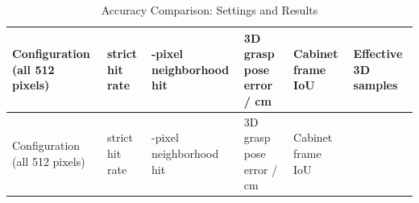 \FloatBarrier\begingroup\small\setlength{\tabcolsep}{2.5pt}
\begin{longtable}[]{@{}
  >{\raggedright\arraybackslash}p{}
  >{\raggedleft\arraybackslash}p{}
  >{\raggedleft\arraybackslash}p{}
  >{\raggedleft\arraybackslash}p{}
  >{\raggedleft\arraybackslash}p{}
  >{\raggedleft\arraybackslash}p{}@{}}
\caption{Accuracy Comparison: Settings and Results}\label{tab:s22-1}\tabularnewline
\toprule\noalign{}
\begin{minipage}[b]{\linewidth}\raggedright
Configuration (all 512 pixels)
\end{minipage} & \begin{minipage}[b]{\linewidth}\raggedleft
strict hit rate
\end{minipage} & \begin{minipage}[b]{\linewidth}\raggedleft
4-pixel neighborhood hit
\end{minipage} & \begin{minipage}[b]{\linewidth}\raggedleft
3D grasp pose error / cm
\end{minipage} & \begin{minipage}[b]{\linewidth}\raggedleft
Cabinet frame IoU
\end{minipage} & \begin{minipage}[b]{\linewidth}\raggedleft
Effective 3D samples
\end{minipage} \\
\midrule\noalign{}
\endfirsthead
\toprule\noalign{}
\begin{minipage}[b]{\linewidth}\raggedright
Configuration (all 512 pixels)
\end{minipage} & \begin{minipage}[b]{\linewidth}\raggedleft
strict hit rate
\end{minipage} & \begin{minipage}[b]{\linewidth}\raggedleft
4-pixel neighborhood hit
\end{minipage} & \begin{minipage}[b]{\linewidth}\raggedleft
3D grasp pose error / cm
\end{minipage} & \begin{minipage}[b]{\linewidth}\raggedleft
Cabinet frame IoU
\end{minipage} & \begin{minipage}[b]{\linewidth}\raggedleft

\end{minipage}
\end{longtable}
